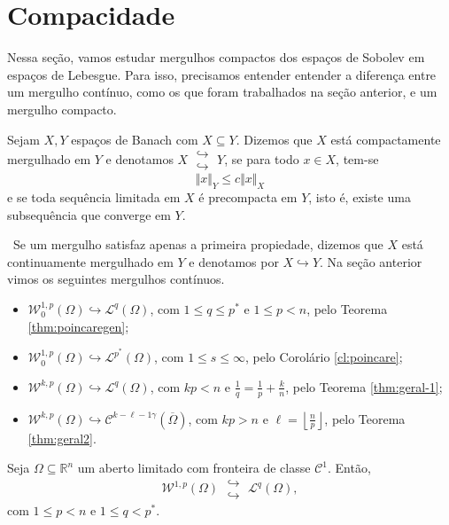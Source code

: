 \documentclass[a4paper, 11pt]{book}
\theoremstyle{definition}
\newcommand{\obs}{\noindent{\textbf{\textcolor{black}{\sffamily Observação:}}}~}
\newcommand{\bR}{\mathbb{R}}
\newcommand{\cC}{\mathcal{C}}
\newcommand{\cL}{\mathcal{L}}
\newcommand{\cW}{\mathcal{W}}
\newcommand{\doublehookrightarrow}{\;\substack{\hookrightarrow \\ \hookrightarrow}\;}
\begin{document}
\section{Compacidade}

Nessa seção, vamos estudar mergulhos compactos dos espaços de Sobolev em espaços de Lebesgue.
Para isso, precisamos entender entender a diferença entre um mergulho contínuo, como os que foram trabalhados na seção anterior, e um mergulho compacto.

\begin{dbox}
    Sejam $X, Y$ espaços de Banach com $X \subseteq Y$. Dizemos que $X$ está compactamente mergulhado em $Y$ e denotamos $X \doublehookrightarrow Y$,
    se para todo $x \in X$, tem-se
    \[
        \Vert x \Vert_{Y} \leqslant c \Vert x \Vert_X
    \]
    e se toda sequência limitada em $X$ é precompacta em $Y$, isto é, existe uma subsequência que converge em $Y$.
\end{dbox}

\obs Se um mergulho satisfaz apenas a primeira propiedade, dizemos que $X$ está continuamente mergulhado em $Y$ e denotamos por $X \hookrightarrow Y$. Na seção anterior vimos os seguintes mergulhos contínuos.
\begin{itemize}
    \item $\cW^{1,p}_0(\Omega) \hookrightarrow \cL^q(\Omega)$, com $1 \leqslant q \leqslant p^*$ e $1 \leqslant p < n$, pelo Teorema \ref{thm:poincaregen};
    \item $\cW^{1,p}_0(\Omega) \hookrightarrow \cL^{p^*}(\Omega)$, com $1 \leqslant s \leqslant \infty$, pelo Corolário \ref{cl:poincare};
    \item $\cW^{k,p}(\Omega) \hookrightarrow \cL^q(\Omega)$, com $kp < n$ e $\frac{1}{q} = \frac{1}{p} + \frac{k}{n}$, pelo Teorema \ref{thm:geral-1};
    \item $\cW^{k,p}(\Omega) \hookrightarrow \cC^{k-\ell-1\gamma}(\overline\Omega)$, com $kp > n$ e $\ell = \left\lfloor \frac{n}{p} \right\rfloor$, pelo Teorema \ref{thm:geral2}.
\end{itemize}

\begin{tbox} \label{thm:compacidade}
    Seja $\Omega \subseteq \bR^n$ um aberto limitado com fronteira de classe $\cC^1$.
    Então,
    \[
        \cW^{1,p}(\Omega) \doublehookrightarrow \cL^q(\Omega),
    \]
    com $1 \leqslant p < n$ e $1 \leqslant q < p^*$.
\end{tbox}
\end{document}
